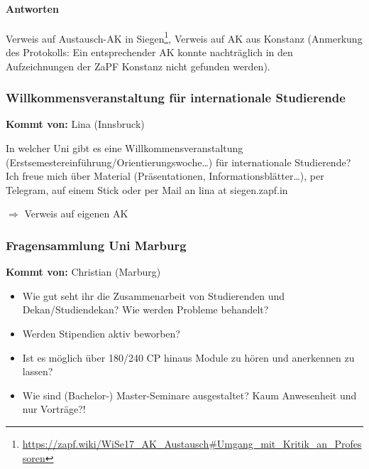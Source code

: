      \paragraph{Antworten}
        Verweis auf Austausch-AK in Siegen\footnote{\url{https://zapf.wiki/WiSe17_AK_Austausch\#Umgang_mit_Kritik_an_Professoren}}, 
        Verweis auf AK aus Konstanz (Anmerkung des Protokolls: Ein entsprechender AK konnte nachträglich in den Aufzeichnungen der ZaPF Konstanz nicht gefunden werden).

    \subsubsection*{Willkommensveranstaltung für internationale Studierende}
      \textbf{Kommt von:} Lina (Innsbruck)

In welcher Uni gibt es eine Willkommensveranstaltung (Erstsemestereinführung/Orientierungswoche…) für internationale Studierende?
Ich freue mich über Material (Präsentationen, Informationsblätter…), per Telegram, auf einem Stick oder per Mail an lina at siegen.zapf.in

    $\Rightarrow$ Verweis auf eigenen AK

    \subsubsection*{Fragensammlung Uni Marburg}
      \textbf{Kommt von:} Christian (Marburg)
        \begin{itemize}
          \item Wie gut seht ihr die Zusammenarbeit von Studierenden und Dekan/Studiendekan? Wie werden Probleme behandelt?
          \item Werden Stipendien aktiv beworben?
          \item Ist es möglich über 180/240 CP hinaus Module zu hören und anerkennen zu lassen?
          \item Wie sind (Bachelor-) Master-Seminare ausgestaltet? Kaum Anwesenheit und nur Vorträge?!
        \end{itemize}


